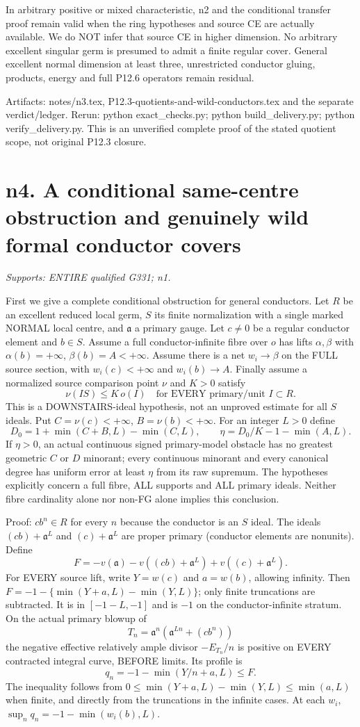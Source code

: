 \documentclass[11pt]{article}
\begin{document}
In arbitrary positive or mixed characteristic, n2 and the conditional
transfer proof remain valid when the ring hypotheses and source CE are
actually available. We do NOT infer that source CE in higher dimension.
No arbitrary excellent singular germ is presumed to admit a finite regular
cover. General excellent normal dimension at least three, unrestricted
conductor gluing, products, energy and full P12.6 operators remain residual.

Artifacts: notes/n3.tex, P12.3-quotients-and-wild-conductors.tex and the
separate verdict/ledger. Rerun: python exact\_checks.py;
python build\_delivery.py; python verify\_delivery.py. This is an unverified
complete proof of the stated quotient scope, not original P12.3 closure.

\section{n4. A conditional same-centre obstruction and genuinely wild formal conductor covers}
\textit{Supports: ENTIRE qualified G331; n1.}

First we give a complete conditional obstruction for general conductors.
Let $R$ be an excellent reduced local germ, $S$ its finite normalization
with a single marked NORMAL local centre, and $\mathfrak a$ a primary
gauge. Let $c\ne0$ be a regular conductor element and $b\in S$.
Assume a full conductor-infinite fibre over $o$ has lifts $\alpha,\beta$
with $\alpha(b)=+\infty$, $\beta(b)=A<+\infty$. Assume there is a net
$w_i\to\beta$ on the FULL source section, with $w_i(c)<+\infty$ and
$w_i(b)\to A$. Finally assume a normalized source comparison point $\nu$
and $K>0$ satisfy
\[
 \nu(IS)\le K\,o(I)\quad\text{for EVERY primary/unit }I\subset R.
\]
This is a DOWNSTAIRS-ideal hypothesis, not an unproved estimate for all
$S$ ideals. Put $C=\nu(c)<+\infty$, $B=\nu(b)<+\infty$. For an integer
$L>0$ define
\[
 D_0=1+\min(C+B,L)-\min(C,L),\qquad
 \eta=D_0/K-1-\min(A,L).
\]
If $\eta>0$, an actual continuous signed primary-model obstacle has no
greatest geometric $C$ or $D$ minorant; every continuous minorant and every
canonical degree has uniform error at least $\eta$ from its raw supremum.
The hypotheses explicitly concern a full fibre, ALL supports and ALL
primary ideals. Neither fibre cardinality alone nor non-FG alone implies
this conclusion.

Proof: $cb^n\in R$ for every $n$ because the conductor is an $S$ ideal.
The ideals $(cb)+\mathfrak a^L$ and $(c)+\mathfrak a^L$ are proper
primary (conductor elements are nonunits). Define
\[
 F=-v(\mathfrak a)-v((cb)+\mathfrak a^L)+v((c)+\mathfrak a^L).
\]
For EVERY source lift, write $Y=w(c)$ and $a=w(b)$, allowing infinity.
Then $F=-1-\{\min(Y+a,L)-\min(Y,L)\}$; only finite truncations are
subtracted. It is in $[-1-L,-1]$ and is $-1$ on the conductor-infinite
stratum. On the actual primary blowup of
\[
 T_n=\mathfrak a^n(\mathfrak a^{Ln}+(cb^n))
\]
the negative effective relatively ample divisor $-E_{T_n}/n$ is positive
on EVERY contracted integral curve, BEFORE limits. Its profile is
\[
 q_n=-1-\min(Y/n+a,L)\le F.
\]
The inequality follows from
$0\le\min(Y+a,L)-\min(Y,L)\le\min(a,L)$ when finite, and directly
from the truncations in the infinite cases. At each $w_i$,
$\sup_n q_n=-1-\min(w_i(b),L)$.
\end{document}
